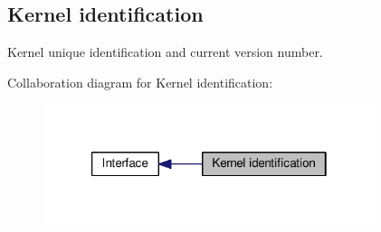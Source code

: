 \hypertarget{group__kern__id}{\subsection{Kernel identification}
\label{group__kern__id}
}


Kernel unique identification and current version number.  


Collaboration diagram for Kernel identification\-:\nopagebreak
\begin{figure}[H]
\begin{center}
\leavevmode
\includegraphics[width=274pt]{group__kern__id}
\end{center}
\end{figure}

